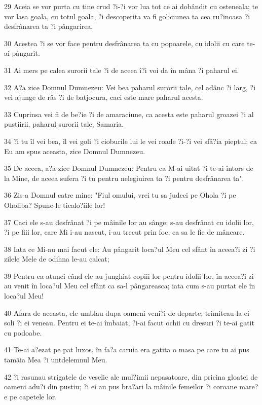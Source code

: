 \par 29 Aceia se vor purta cu tine crud ?i-?i vor lua tot ce ai dobândit cu osteneala; te vor lasa goala, cu totul goala, ?i descoperita va fi goliciunea ta cea ru?inoasa ?i desfrânarea ta ?i pângarirea.
\par 30 Acestea ?i se vor face pentru desfrânarea ta cu popoarele, cu idolii cu care te-ai pângarit.
\par 31 Ai mers pe calea surorii tale ?i de aceea î?i voi da în mâna ?i paharul ei.
\par 32 A?a zice Domnul Dumnezeu: Vei bea paharul surorii tale, cel adânc ?i larg, ?i vei ajunge de râs ?i de batjocura, caci este mare paharul acesta.
\par 33 Cuprinsa vei fi de be?ie ?i de amaraciune, ca acesta este paharul groazei ?i al pustiirii, paharul surorii tale, Samaria.
\par 34 ?i tu îl vei bea, îl vei goli ?i cioburile lui le vei roade ?i-?i vei sfâ?ia pieptul; ca Eu am spus aceasta, zice Domnul Dumnezeu.
\par 35 De aceea, a?a zice Domnul Dumnezeu: Pentru ca M-ai uitat ?i te-ai întors de la Mine, de aceea sufera ?i tu pentru nelegiuirea ta ?i pentru desfrânarea ta".
\par 36 Zis-a Domnul catre mine: "Fiul omului, vrei tu sa judeci pe Ohola ?i pe Oholiba? Spune-le ticalo?iile lor!
\par 37 Caci ele s-au desfrânat ?i pe mâinile lor au sânge; s-au desfrânat cu idolii lor, ?i pe fiii lor, care Mi i-au nascut, i-au trecut prin foc, ca sa le fie de mâncare.
\par 38 Iata ce Mi-au mai facut ele: Au pângarit loca?ul Meu cel sfânt în aceea?i zi ?i zilele Mele de odihna le-au calcat;
\par 39 Pentru ca atunci când ele au junghiat copiii lor pentru idolii lor, în aceea?i zi au venit în loca?ul Meu cel sfânt ca sa-l pângareasca; iata cum s-au purtat ele în loca?ul Meu!
\par 40 Afara de aceasta, ele umblau dupa oameni veni?i de departe; trimiteau la ei soli ?i ei veneau. Pentru ei te-ai îmbaiat, ?i-ai facut ochii cu dresuri ?i te-ai gatit cu podoabe.
\par 41 Te-ai a?ezat pe pat luxos, în fa?a caruia era gatita o masa pe care tu ai pus tamâia Mea ?i untdelemnul Meu.
\par 42 ?i rasunau strigatele de veselie ale mul?imii nepasatoare, din pricina gloatei de oameni adu?i din pustiu; ?i ei au pus bra?ari la mâinile femeilor ?i coroane mare?e pe capetele lor.
